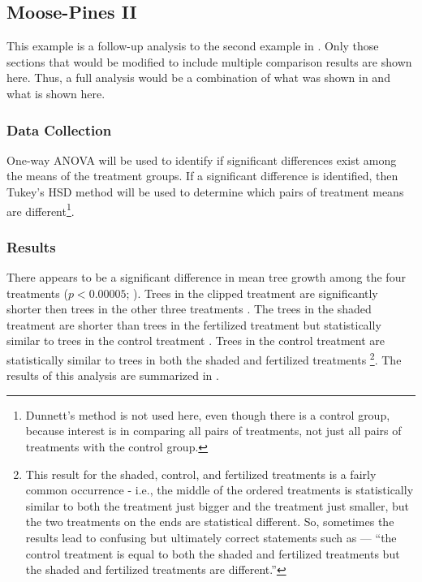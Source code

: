\documentclass[10pt,openany]{book}\usepackage[]{graphicx}\usepackage[]{color}
\begin{document}
\subsection{Moose-Pines II}
This example is a follow-up analysis to the second example in .  Only those sections that would be modified to include multiple comparison results are shown here.  Thus, a full analysis would be a combination of what was shown in  and what is shown here.

\subsubsection*{Data Collection}
One-way ANOVA will be used to identify if significant differences exist among the means of the treatment groups.  If a significant difference is identified, then Tukey's HSD method will be used to determine which pairs of treatment means are different\footnote{Dunnett's method is not used here, even though there is a control group, because interest is in comparing all pairs of treatments, not just all pairs of treatments with the control group.}.

\subsubsection*{Results}
There appears to be a significant difference in mean tree growth among the four treatments ($p<0.00005$; ).  Trees in the clipped treatment are significantly shorter then trees in the other three treatments .  The trees in the shaded treatment are shorter than trees in the fertilized treatment but statistically similar to trees in the control treatment .  Trees in the control treatment are statistically similar to trees in both the shaded and fertilized treatments \footnote{This result for the shaded, control, and fertilized treatments is a fairly common occurrence - i.e., the middle of the ordered treatments is statistically similar to both the treatment just bigger and the treatment just smaller, but the two treatments on the ends are statistical different.  So, sometimes the results lead to confusing but ultimately correct statements such as --- ``the control treatment is equal to both the shaded and fertilized treatments but the shaded and fertilized treatments are different.''}.  The results of this analysis are summarized in .
\end{document}
